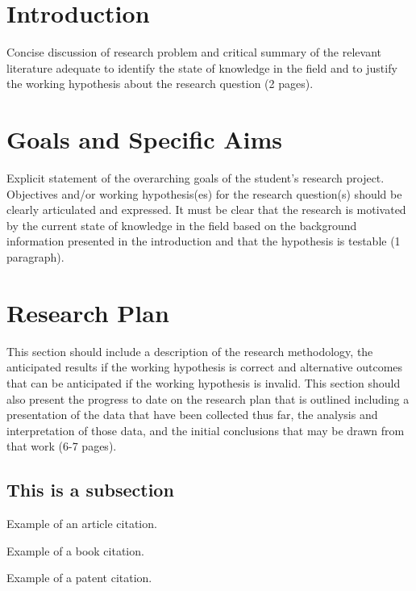 \documentclass[12pt]{article}
\begin{document}




\section*{Introduction}
Concise discussion of research problem and critical summary of the relevant literature adequate to identify the state of knowledge in the field and to justify the working hypothesis about the research question (2 pages).

\section*{Goals and Specific Aims}
Explicit statement of the overarching goals of the student’s research project. Objectives and/or working hypothesis(es) for the research question(s) should be clearly articulated and expressed. It must be clear that the research is motivated by the current state of knowledge in the field based on the background information presented in the introduction and that the hypothesis is testable (1 paragraph).

\section*{Research Plan}
This section should include a description of the research methodology, the anticipated results if the working hypothesis is correct and alternative outcomes that can be anticipated if the working hypothesis is invalid. This section should also present the progress to date on the research plan that is outlined including a presentation of the data that have been collected thus far, the analysis and interpretation of those data, and the initial conclusions that may be drawn from that work (6-7 pages).

\subsection*{This is a subsection}
Example of an article citation.\autocite{le}

Example of a book citation.\autocite{cramer}

Example of a patent citation.\autocite{song}
\end{document}
